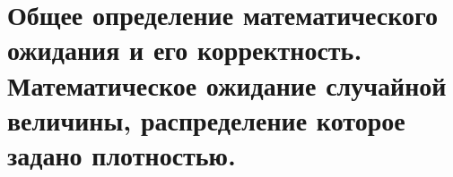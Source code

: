 \section{Общее определение математического ожидания и его корректность. Математическое ожидание случайной величины, распределение которое задано плотностью.}